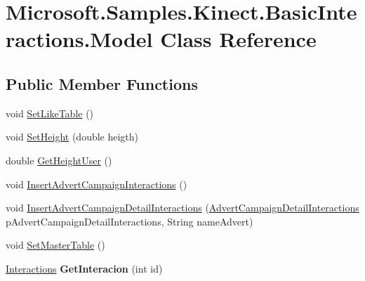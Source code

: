 \hypertarget{class_microsoft_1_1_samples_1_1_kinect_1_1_basic_interactions_1_1_model}{\section{Microsoft.\-Samples.\-Kinect.\-Basic\-Interactions.\-Model Class Reference}
\label{class_microsoft_1_1_samples_1_1_kinect_1_1_basic_interactions_1_1_model}
}
\subsection*{Public Member Functions}
\begin{DoxyCompactItemize}
\item 
void \hyperlink{class_microsoft_1_1_samples_1_1_kinect_1_1_basic_interactions_1_1_model_afbd66a6b0720fa2435c09a7d8ce46f61}{Set\-Like\-Table} ()
\item 
void \hyperlink{class_microsoft_1_1_samples_1_1_kinect_1_1_basic_interactions_1_1_model_aa3d95174632cd94403b17063e6f496fd}{Set\-Height} (double heigth)
\item 
double \hyperlink{class_microsoft_1_1_samples_1_1_kinect_1_1_basic_interactions_1_1_model_a45e0a2282c319e4c63e383639fd795d0}{Get\-Height\-User} ()
\item 
void \hyperlink{class_microsoft_1_1_samples_1_1_kinect_1_1_basic_interactions_1_1_model_a58934cbd971cea82c26a829b5b451100}{Insert\-Advert\-Campaign\-Interactions} ()
\item 
void \hyperlink{class_microsoft_1_1_samples_1_1_kinect_1_1_basic_interactions_1_1_model_a04d878aaf47bf78ff1172eaa5b90dc64}{Insert\-Advert\-Campaign\-Detail\-Interactions} (\hyperlink{class_microsoft_1_1_samples_1_1_kinect_1_1_basic_interactions_1_1_advert_campaign_detail_interactions}{Advert\-Campaign\-Detail\-Interactions} p\-Advert\-Campaign\-Detail\-Interactions, String name\-Advert)
\item 
void \hyperlink{class_microsoft_1_1_samples_1_1_kinect_1_1_basic_interactions_1_1_model_a25df504bd0f87ca4756f44af1f9dd602}{Set\-Master\-Table} ()
\item 
\hypertarget{class_microsoft_1_1_samples_1_1_kinect_1_1_basic_interactions_1_1_model_ae1cd343c7bae7fbf1094f9f73a074698}{\hyperlink{class_microsoft_1_1_samples_1_1_kinect_1_1_basic_interactions_1_1_interactions}{Interactions} {\bfseries Get\-Interacion} (int id)}\label{class_microsoft_1_1_samples_1_1_kinect_1_1_basic_interactions_1_1_model_ae1cd343c7bae7fbf1094f9f73a074698}


\end{DoxyCompactItemize}
